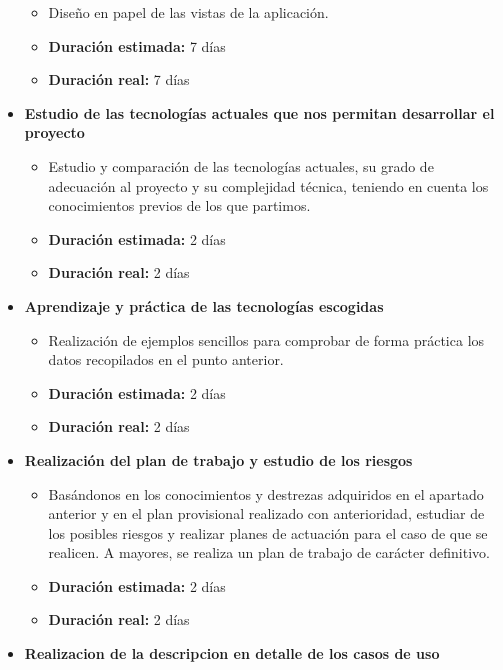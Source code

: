 \documentclass[openright,twoside,10pt]{book}
\providecommand{\tightlist}{%
  \setlength{\itemsep}{0pt}\setlength{\parskip}{0pt}}
\begin{document}
\begin{itemize}
      \begin{itemize}
      \tightlist
      \item
        Diseño en papel de las vistas de la aplicación.
      \item
        \textbf{Duración estimada:} 7 días
      \item
        \textbf{Duración real:} 7 días
      \end{itemize}
    \item
      \textbf{Estudio de las tecnologías actuales que nos permitan
      desarrollar el proyecto}
    
      \begin{itemize}
      \tightlist
      \item
        Estudio y comparación de las tecnologías actuales, su grado de
        adecuación al proyecto y su complejidad técnica, teniendo en cuenta
        los conocimientos previos de los que partimos.
      \item
        \textbf{Duración estimada:} 2 días
      \item
        \textbf{Duración real:} 2 días
      \end{itemize}
    \item
      \textbf{Aprendizaje y práctica de las tecnologías escogidas}
    
      \begin{itemize}
      \tightlist
      \item
        Realización de ejemplos sencillos para comprobar de forma práctica
        los datos recopilados en el punto anterior.
      \item
        \textbf{Duración estimada:} 2 días
      \item
        \textbf{Duración real:} 2 días
      \end{itemize}
    \item
      \textbf{Realización del plan de trabajo y estudio de los riesgos}
    
      \begin{itemize}
      \tightlist
      \item
        Basándonos en los conocimientos y destrezas adquiridos en el
        apartado anterior y en el plan provisional realizado con
        anterioridad, estudiar de los posibles riesgos y realizar planes de
        actuación para el caso de que se realicen. A mayores, se realiza un
        plan de trabajo de carácter definitivo.
      \item
        \textbf{Duración estimada:} 2 días
      \item
        \textbf{Duración real:} 2 días
      \end{itemize}
    \item
      \textbf{Realizacion de la descripcion en detalle de los casos de uso}
    

\end{itemize}
\end{document}
